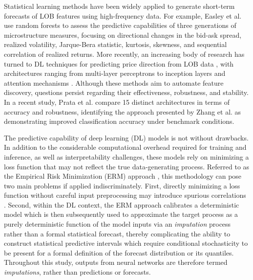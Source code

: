 \documentclass[10pt,a4paper,oneside]{article}
\begin{document}
Statistical learning methods have been widely applied to generate short-term forecasts of LOB features using high-frequency data. For example, Easley et al. \cite{easley2021microstructure} use random forests to assess the predictive capabilities of three generations of microstructure measures, focusing on directional changes in the bid-ask spread, realized volatility, Jarque-Bera statistic, kurtosis, skewness, and sequential correlation of realized returns. More recently, an increasing body of research has turned to DL techniques for predicting price direction from LOB data \cite{tsantekidis2017using, Zhang_2019, zhang2021deeplearningmarketorder, kolm2023deep, kolm2024improving, briola2024deep, prata2024lob}, with architectures ranging from multi-layer perceptrons \cite{tsantekidis2017using} to inception layers \cite{Zhang_2019} and attention mechanisms \cite{zhang2021deeplearningmarketorder}. Although these methods aim to automate feature discovery, questions persist regarding their effectiveness, robustness, and stability. In a recent study, Prata et al. \cite{prata2024lob} compare 15 distinct architectures in terms of accuracy and robustness, identifying the approach presented by Zhang et al. \cite{zhang2021deeplearningmarketorder} as demonstrating improved classification accuracy under benchmark conditions.

The predictive capability of deep learning (DL) models is not without drawbacks. In addition to the considerable computational overhead required for training and inference, as well as interpretability challenges, these models rely on minimizing a loss function that may not reflect the true data-generating process. Referred to as the Empirical Risk Minimization (ERM) approach \cite{breiman2001statistical}, this methodology can pose two main problems if applied indiscriminately. First, directly minimizing a loss function without careful input preprocessing may introduce spurious correlations \cite{granger1974spurious, phillips1986understanding}. Second, within the DL context, the ERM approach calibrates a deterministic model which is then subsequently used to approximate the target process as a purely deterministic function of the model inputs via an \emph{imputation} process rather than a formal statistical forecast, thereby complicating the ability to construct statistical predictive intervals which require conditional stochasticity to be present for a formal definition of the forecast distribution or its quantiles. Throughout this study, outputs from neural networks are therefore termed \emph{imputations}, rather than predictions or forecasts.
\end{document}
